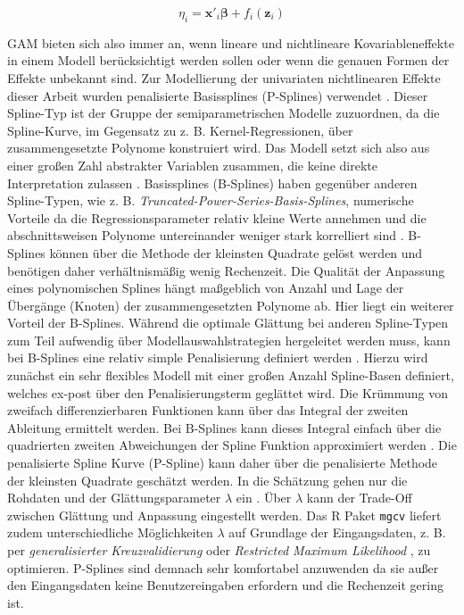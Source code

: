 \documentclass{Vorlage}
\begin{document}
\begin{equation} \label{SplinePraed}
\eta_{i} =\mathbf{x}'_i \boldsymbol{\beta}+f_{i}(\mathbf{z}_{i})
\end{equation}

GAM bieten sich also immer an, wenn lineare und nichtlineare Kovariableneffekte in einem Modell berücksichtigt werden sollen oder wenn die genauen Formen der Effekte unbekannt sind. Zur Modellierung der univariaten nichtlinearen Effekte dieser Arbeit wurden penalisierte Basissplines (P-Splines) verwendet \cite{eilers1996}. Dieser Spline-Typ ist der Gruppe der semiparametrischen Modelle zuzuordnen, da die Spline-Kurve, im Gegensatz zu z. B. Kernel-Regressionen, über zusammengesetzte Polynome konstruiert wird. Das Modell setzt sich also aus einer großen Zahl abstrakter Variablen zusammen, die keine direkte Interpretation zulassen \cite[p. 1]{eilers1996}. Basissplines (B-Splines) haben gegenüber anderen Spline-Typen, wie z. B. \textit{Truncated-Power-Series-Basis-Splines}, numerische Vorteile da die Regressionsparameter relativ kleine Werte annehmen und die abschnittsweisen Polynome untereinander weniger stark korrelliert sind \cite[p. 426]{fahrmeir2013regression}. B-Splines können über die Methode der kleinsten Quadrate gelöst werden \cite[p. 430]{fahrmeir2013regression} und benötigen daher verhältnismäßig wenig Rechenzeit. Die Qualität der Anpassung eines polynomischen Splines hängt maßgeblich von Anzahl und Lage der Übergänge (Knoten) der zusammengesetzten Polynome ab. Hier liegt ein weiterer Vorteil der B-Splines. Während die optimale Glättung bei anderen Spline-Typen zum Teil aufwendig über Modellauswahlstrategien hergeleitet werden muss, kann bei B-Splines eine relativ simple Penalisierung definiert werden \cite[p. 89 f.]{eilers1996}. Hierzu wird zunächst ein sehr flexibles Modell mit einer großen Anzahl Spline-Basen definiert, welches ex-post über den Penalisierungsterm geglättet wird. Die Krümmung von zweifach differenzierbaren Funktionen kann über das Integral der zweiten Ableitung ermittelt werden. Bei B-Splines kann dieses Integral einfach über die quadrierten zweiten Abweichungen der Spline Funktion approximiert werden \cite[p. 433]{fahrmeir2013regression}. Die penalisierte Spline Kurve (P-Spline) kann daher über die penalisierte Methode der kleinsten Quadrate geschätzt werden. In die Schätzung gehen nur die Rohdaten und der Glättungsparameter $\lambda$ ein \cite[p. 93]{eilers1996}. Über $\lambda$ kann der Trade-Off zwischen Glättung und Anpassung eingestellt werden. Das R Paket \texttt{mgcv} \cite{Wood2011} liefert zudem unterschiedliche Möglichkeiten $\lambda$ auf Grundlage der Eingangsdaten, z. B. per \textit{generalisierter Kreuzvalidierung} \cite[p. 480]{fahrmeir2013regression} oder \textit{Restricted Maximum Likelihood} \cite[p. 32 f.]{wood2016}, zu optimieren. P-Splines sind demnach sehr komfortabel anzuwenden da sie außer den Eingangsdaten keine Benutzereingaben erfordern und die Rechenzeit gering ist.\\
\end{document}
